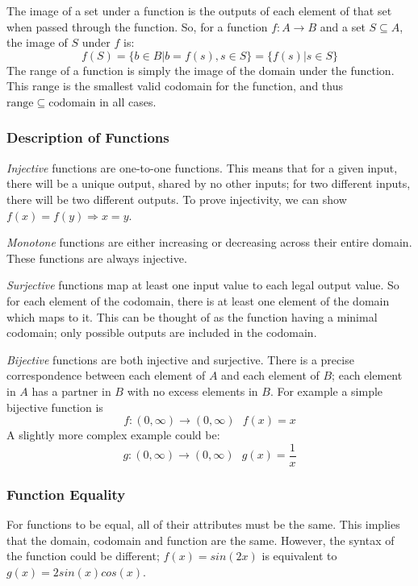 \documentclass[12pt]{report}
\begin{document}
\begin{flushleft}
\bigskip
The image of a set under a function is the outputs of each element of that set 
when passed through the function. So, for a function \(f: A \rightarrow B\) and
a set \(S \subseteq A\), the image of \(S\) under \(f\) is:
\[f(S) = \{b \in B | b = f(s), s \in S\} = \{f(s) | s \in S\}\]
The range of a function is simply the image of the domain under the function. 
This range is the smallest valid codomain for the function, and thus 
\(\mathrm{range} \subseteq \mathrm{codomain}\) in all cases.

\subsubsection*{Description of Functions}
\textit{Injective} functions are one-to-one functions. This means that for a 
given input, there will be a unique output, shared by no other inputs; for two
different inputs, there will be two different outputs. To prove injectivity, 
we can show \(f(x) = f(y) \Rightarrow x = y\).

\bigskip
\textit{Monotone} functions are either increasing or decreasing across their 
entire domain. These functions are always injective.

\bigskip
\textit{Surjective} functions map at least one input value to each legal output
value. So for each element of the codomain, there is at least one element of 
the domain which maps to it. This can be thought of as the function having a 
minimal codomain; only possible outputs are included in the codomain.

\bigskip
\textit{Bijective} functions are both injective and surjective. There is a 
precise correspondence between each element of \(A\) and each element of \(B\);
each element in \(A\) has a partner in \(B\) with no excess elements in \(B\). 
For example a simple bijective function is
\[f: (0, \infty) \rightarrow (0, \infty)\:\:\:f(x) = x\]
A slightly more complex example could be:
\[g: (0, \infty) \rightarrow (0, \infty)\:\:\:g(x) = \frac{1}{x}\]

\subsubsection*{Function Equality}
For functions to be equal, all of their attributes must be the same. This 
implies that the domain, codomain and function are the same. However, the 
syntax of the function could be different; \(f(x) = sin(2x)\) is equivalent
to \(g(x) = 2sin(x)cos(x)\). 


\end{flushleft}
\end{document}
